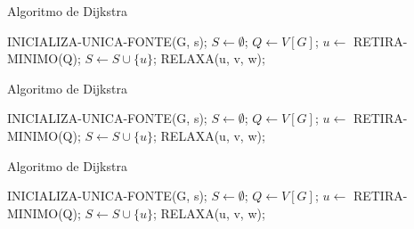 \documentclass[aspectratio=169]{beamer}
\begin{document}
	\begin{frame}{Algoritmo de Dijkstra}
		\begin{algorithm}[H]
			\caption{Dijkstra}\label{alg:d}
			\begin{algorithmic}[1]
				\State INICIALIZA-UNICA-FONTE(G, s);               
				\State $S\gets \emptyset$;
				\State $Q\gets V[G]$;
				\State $u\gets$ RETIRA-MINIMO(Q);              
				\State $S\gets S \cup \{u\}$;
				\State RELAXA(u, v, w);
				\EndFor
				\EndWhile\label{euclidendwhile}
				\EndProcedure
			\end{algorithmic}
		\end{algorithm}
	\end{frame}
	
	\begin{frame}{Algoritmo de Dijkstra}
		\begin{algorithm}[H]
			\caption{Dijkstra}\label{alg:d}
			\begin{algorithmic}[1]
				\State INICIALIZA-UNICA-FONTE(G, s);               
				\State $S\gets \emptyset$;
				\State $Q\gets V[G]$;
				                       
				\State $u\gets$ RETIRA-MINIMO(Q);               
				\State $S\gets S \cup \{u\}$;
				\State RELAXA(u, v, w);
				\EndFor
				\EndWhile\label{euclidendwhile}
				\EndProcedure
			\end{algorithmic}
		\end{algorithm}
	\end{frame}
	
	\begin{frame}{Algoritmo de Dijkstra}
		\begin{algorithm}[H]
			\caption{Dijkstra}\label{alg:d}
			\begin{algorithmic}[1]
				\State INICIALIZA-UNICA-FONTE(G, s);               
				\State $S\gets \emptyset$;
				\State $Q\gets V[G]$;
				                       
				\State $u\gets$ RETIRA-MINIMO(Q);               
				\State $S\gets S \cup \{u\}$;
				\State RELAXA(u, v, w);
				\EndFor
				\EndWhile\label{euclidendwhile}
				\EndProcedure
			\end{algorithmic}
		\end{algorithm}
	\end{frame}
	
\end{document}
